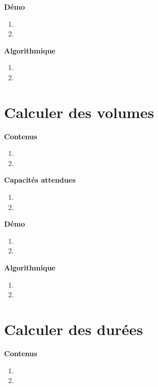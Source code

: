 \documentclass[10pt,a4paper]{article}
\begin{document}
\textbf{Démo}

\begin{enumerate}
\item 
\item 
\end{enumerate}

\textbf{Algorithmique}

\begin{enumerate}
\item 
\item 
\end{enumerate}

\section{Calculer des volumes}

\textbf{Contenus}

\begin{enumerate} 
\item 
\item 
\end{enumerate}


\textbf{Capacités attendues}

\begin{enumerate}
\item 
\item 
\end{enumerate}

\textbf{Démo}

\begin{enumerate}
\item 
\item 
\end{enumerate}

\textbf{Algorithmique}

\begin{enumerate}
\item 
\item 
\end{enumerate}

\section{Calculer des durées}

\textbf{Contenus}

\begin{enumerate} 
\item 
\item 
\end{enumerate}
\end{document}
